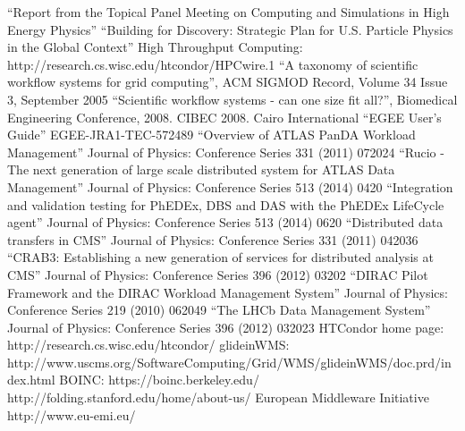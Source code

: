 \begin{thebibliography}{99}
 ``Report from the Topical Panel Meeting on Computing and
Simulations in High Energy Physics''
 ``Building for Discovery: Strategic Plan for U.S. Particle Physics in the Global Context''
 High Throughput Computing: http://research.cs.wisc.edu/htcondor/HPCwire.1
 ``A taxonomy of scientific workflow systems for grid computing'', ACM SIGMOD Record, Volume 34 Issue 3, September 2005
 ``Scientific workflow systems - can one size fit all?'', Biomedical Engineering Conference, 2008. CIBEC 2008. Cairo International
 ``EGEE User’s Guide'' EGEE-JRA1-TEC-572489
 ``Overview of ATLAS PanDA Workload Management'' Journal of Physics: Conference Series 331 (2011) 072024
 ``Rucio - The next generation of large scale distributed system for ATLAS Data Management'' Journal of Physics: Conference Series 513 (2014) 0420
 ``Integration and validation testing for PhEDEx, DBS and DAS with the PhEDEx LifeCycle agent'' Journal of Physics: Conference Series 513 (2014) 0620
 ``Distributed data transfers in CMS'' Journal of Physics: Conference Series 331 (2011) 042036
 ``CRAB3: Establishing a new generation of services for distributed analysis at CMS'' Journal of Physics: Conference Series 396 (2012) 03202
 ``DIRAC Pilot Framework and the DIRAC Workload Management System'' Journal of Physics: Conference Series 219 (2010) 062049
 ``The LHCb Data Management System'' Journal of Physics: Conference Series 396 (2012) 032023
 HTCondor home page: http://research.cs.wisc.edu/htcondor/
 glideinWMS: http://www.uscms.org/SoftwareComputing/Grid/WMS/glideinWMS/doc.prd/index.html
 BOINC: https://boinc.berkeley.edu/
 http://folding.stanford.edu/home/about-us/
 European Middleware Initiative http://www.eu-emi.eu/
\end{thebibliography}
